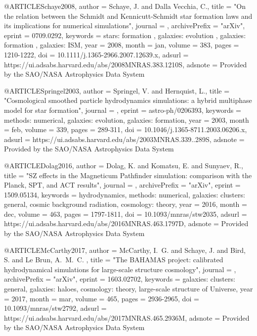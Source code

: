 \documentclass[useAMS,usenatbib]{mnras}
\begin{document}
{{{{{{{{{{{{{{@ARTICLE{Schaye2008,
   author = {{Schaye}, J. and {Dalla Vecchia}, C.},
    title = "{On the relation between the Schmidt and Kennicutt-Schmidt star formation laws and its implications for numerical simulations}",
  journal = {\mnras},
archivePrefix = "arXiv",
   eprint = {0709.0292},
 keywords = {stars: formation , galaxies: evolution , galaxies: formation , galaxies: ISM},
     year = 2008,
    month = jan,
   volume = 383,
    pages = {1210-1222},
      doi = {10.1111/j.1365-2966.2007.12639.x},
   adsurl = {https://ui.adsabs.harvard.edu/abs/2008MNRAS.383.1210S},
  adsnote = {Provided by the SAO/NASA Astrophysics Data System}
}

@ARTICLE{Springel2003,
   author = {{Springel}, V. and {Hernquist}, L.},
    title = "{Cosmological smoothed particle hydrodynamics simulations: a hybrid multiphase model for star formation}",
  journal = {\mnras},
   eprint = {astro-ph/0206393},
 keywords = {methods: numerical, galaxies: evolution, galaxies: formation},
     year = 2003,
    month = feb,
   volume = 339,
    pages = {289-311},
      doi = {10.1046/j.1365-8711.2003.06206.x},
   adsurl = {https://ui.adsabs.harvard.edu/abs/2003MNRAS.339..289S},
  adsnote = {Provided by the SAO/NASA Astrophysics Data System}
}

@ARTICLE{Dolag2016,
   author = {{Dolag}, K. and {Komatsu}, E. and {Sunyaev}, R.},
    title = "{SZ effects in the Magneticum Pathfinder simulation: comparison with the Planck, SPT, and ACT results}",
  journal = {\mnras},
archivePrefix = "arXiv",
   eprint = {1509.05134},
 keywords = {hydrodynamics, methods: numerical, galaxies: clusters: general, cosmic background radiation, cosmology: theory},
     year = 2016,
    month = dec,
   volume = 463,
    pages = {1797-1811},
      doi = {10.1093/mnras/stw2035},
   adsurl = {https://ui.adsabs.harvard.edu/abs/2016MNRAS.463.1797D},
  adsnote = {Provided by the SAO/NASA Astrophysics Data System}
}

@ARTICLE{McCarthy2017,
   author = {{McCarthy}, I.~G. and {Schaye}, J. and {Bird}, S. and {Le Brun}, A.~M.~C.
	},
    title = "{The BAHAMAS project: calibrated hydrodynamical simulations for large-scale structure cosmology}",
  journal = {\mnras},
archivePrefix = "arXiv",
   eprint = {1603.02702},
 keywords = {galaxies: clusters: general, galaxies: haloes, cosmology: theory, large-scale structure of Universe},
     year = 2017,
    month = mar,
   volume = 465,
    pages = {2936-2965},
      doi = {10.1093/mnras/stw2792},
   adsurl = {https://ui.adsabs.harvard.edu/abs/2017MNRAS.465.2936M},
  adsnote = {Provided by the SAO/NASA Astrophysics Data System}
}

}}}}}}}}}}}}}}
\end{document}

